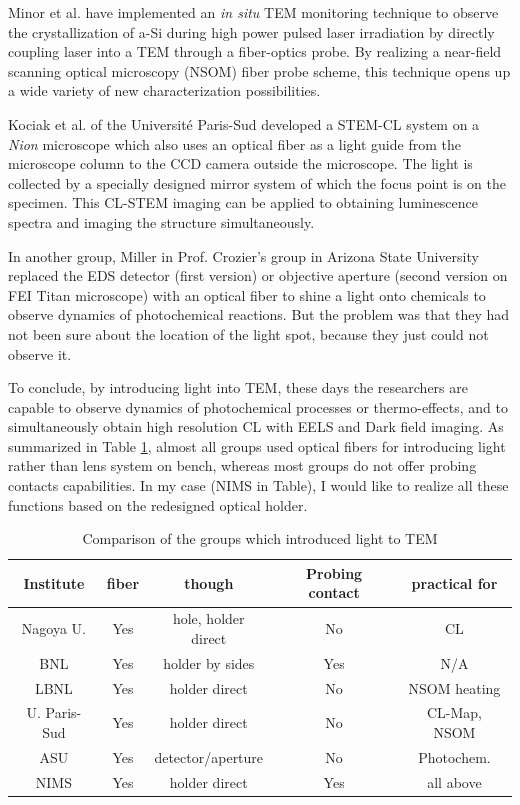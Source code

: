 Minor et al. have implemented an {\it in situ} TEM monitoring technique to observe the crystallization of a-Si during high power pulsed laser irradiation by directly coupling laser into a TEM through a fiber-optics probe. By realizing a near-field scanning optical microscopy (NSOM) fiber probe scheme, this technique opens up a wide variety of new characterization possibilities.\cite{Xiang2012}

Kociak et al. of the Université Paris-Sud \cite{Zagonel2011} developed a STEM-CL system on a \textit{Nion} microscope which also uses an optical fiber as a light guide from the microscope column to the CCD camera outside the microscope. The light is collected by a specially designed mirror system of which the focus point is on the specimen. This CL-STEM imaging can be applied to obtaining luminescence spectra and imaging the structure simultaneously.\cite{Nagarajan2016Simultaneous}

In another group, Miller in Prof. Crozier's group in Arizona State University replaced the EDS detector (first version) or objective aperture (second version on FEI Titan microscope) with an optical fiber to shine a light onto chemicals to observe dynamics of photochemical reactions.\cite{Miller2012} 
But the problem was that they had not been sure about the location of the light spot, because they just could not observe it.

To conclude, by introducing light into TEM, these days the researchers are capable to observe dynamics of photochemical processes or thermo-effects, and to simultaneously obtain high resolution CL with EELS and Dark field imaging. As summarized in Table \ref{table2.2}, almost all groups used optical fibers for introducing light rather than lens system on bench, whereas most groups do not offer probing contacts capabilities. In my case (NIMS in Table), I would like to realize all these functions based on the redesigned optical holder. 

\begin{table}[ht]
\centering 
\begin{tabular}{|c|c|c|c|c|} 
\hline 
Institute & fiber & though & Probing contact & practical for\\ [0.5ex] 
\hline 
Nagoya U. & Yes & hole, holder direct & No & CL\\[1.5ex] 
BNL & Yes & holder by sides & Yes & N/A\\[1.5ex]
LBNL & Yes& holder direct & No & NSOM heating\\[1.5ex]
U. Paris-Sud & Yes & holder direct & No & CL-Map, NSOM\\[1.5ex]
ASU & Yes & detector/aperture & No & Photochem.\\[1.5ex]
NIMS & Yes & holder direct & Yes & all above\\
\hline
\end{tabular}
\caption{Comparison of the groups which introduced light to TEM} 
\label{table2.2} 
\end{table}

